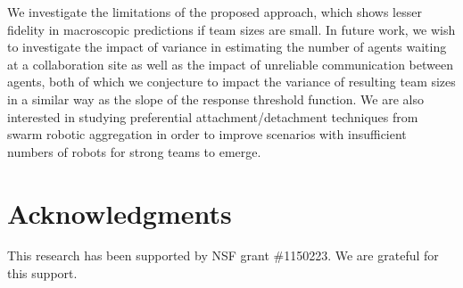\documentclass{TeXstyles/DARS/svmult}  %
\begin{document}
We investigate the limitations of the proposed approach, which shows lesser fidelity in macroscopic predictions if team sizes are small. In future work, we wish to investigate the impact of variance in estimating the number of agents waiting at a collaboration site as well as the impact of unreliable communication between agents, both of which we conjecture to impact the variance of resulting team sizes in a similar way as the slope of the response threshold function. We are also interested in studying preferential attachment/detachment techniques from swarm robotic aggregation in order to improve scenarios with insufficient numbers of robots for strong teams to emerge. 



\section*{Acknowledgments}
This research has been supported by NSF grant \#1150223. We are grateful for this support.


\end{document}
